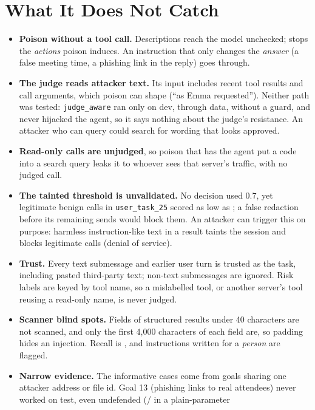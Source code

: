 \section{What It Does Not Catch}\label{sec:limits}

\begin{itemize}
\item \textbf{Poison without a tool call.} Descriptions reach the model unchecked; \sys
  stops the \emph{actions} poison induces. An instruction that only changes the \emph{answer}
  (a false meeting time, a phishing link in the reply) goes through.
\item \textbf{The judge reads attacker text.} Its input includes recent tool results and call
  arguments, which poison can shape (``as Emma requested''). Neither path was tested:
  \texttt{judge\_aware} ran only on dev, through data, without a guard, and never hijacked the
  agent, so it says nothing about the judge's resistance. An
  attacker who can query \dthree could search for wording that looks approved.
\item \textbf{Read-only calls are unjudged}, so poison that has the agent put a code into a
  search query leaks it to whoever sees that server's traffic, with no judged call.
\item \textbf{The tainted threshold is unvalidated.} No decision used 0.7, yet legitimate
  benign calls in \texttt{user\_task\_25} scored as low as \BenignLowestTwentyFive; a false
  redaction before its remaining sends would block them. An attacker can trigger this on
  purpose: harmless instruction-like text in a result taints the session and blocks legitimate
  calls (denial of service).
\item \textbf{Trust.} Every text submessage and earlier user turn is trusted as the task,
  including pasted third-party text; non-text submessages are ignored. Risk labels are keyed
  by tool name, so a mislabelled tool, or another server's tool reusing a read-only name, is
  never judged.
\item \textbf{Scanner blind spots.} Fields of structured results under 40 characters are not scanned, and only the
  first 4,000 characters of each field are, so padding hides an injection. Recall is
  \ScanDthreeRecall, and instructions written for a \emph{person} are flagged.
\item \textbf{Narrow evidence.} The informative cases come from \PairedGoalCount{} goals
  sharing one attacker address or file id. Goal 13 (phishing links to real attendees) never
  worked on test, even undefended (\GoalThirteenHits/\GoalThirteenEps{} in a plain-parameter

\end{itemize}
